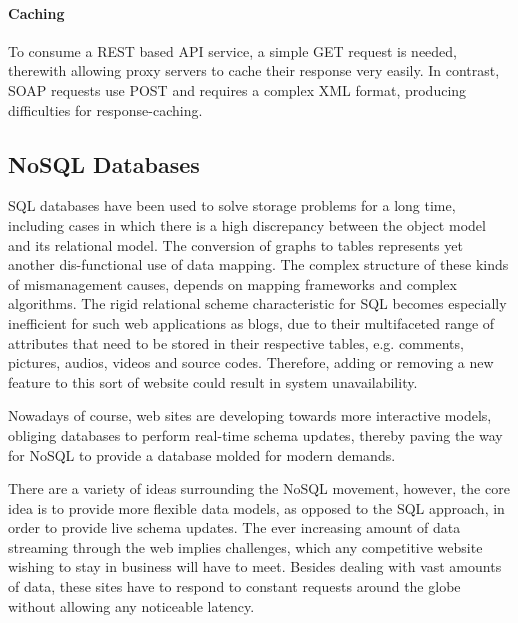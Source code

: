 \paragraph{Caching}

To consume a \ac{REST} based \ac{API} service, a simple GET request is needed, therewith allowing proxy servers to cache their response very easily. In contrast, \ac{SOAP} requests use POST and requires a complex \ac{XML} format, producing difficulties for response-caching.

\subsection{NoSQL Databases \label{sec:back_da_per}}
\ac{SQL} databases have been used to solve storage problems for a long time, including cases in which there is a high discrepancy between the object model and its relational model. The conversion of graphs to tables represents yet another dis-functional use of data mapping. The complex structure of these kinds of mismanagement causes, depends on mapping frameworks and complex algorithms. The rigid relational scheme characteristic for \ac{SQL} becomes especially inefficient for such web applications as blogs, due to their multifaceted range of attributes that need to be stored in their respective tables, e.g. comments, pictures, audios, videos and source codes. Therefore, adding or removing a new feature to this sort of website could result in system unavailability.          

Nowadays of course,  web sites are developing towards more interactive models, obliging databases to perform real-time schema updates, thereby paving the way for \ac{NoSQL} to provide a database molded for modern demands.

There are a variety of ideas surrounding the \ac{NoSQL} movement, however, the core idea is to provide more flexible data models, as opposed to the \ac{SQL} approach, in order to provide live schema updates. The ever increasing amount of data streaming through the web implies challenges, which any competitive website wishing to stay in business will have to meet. Besides dealing with vast amounts of data, these sites have to respond to constant requests around the globe without allowing any noticeable latency.

